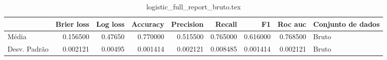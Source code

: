 \begin{table}
\centering
\caption{logistic_full_report_bruto.tex}
\label{logistic_full_report_bruto.tex}
\begin{tabular}{lrrrrrrrl}
\toprule
{} &  Brier  loss &  Log loss &  Accuracy  &  Precision  &   Recall  &       F1  &  Roc auc  & Conjunto de dados \\
\midrule
Média        &     0.156500 &   0.47650 &   0.770000 &    0.515500 &  0.765000 &  0.616000 &  0.768500 &             Bruto \\
Desv. Padrão &     0.002121 &   0.00495 &   0.001414 &    0.002121 &  0.008485 &  0.001414 &  0.002121 &             Bruto \\
\bottomrule
\end{tabular}
\end{table}
